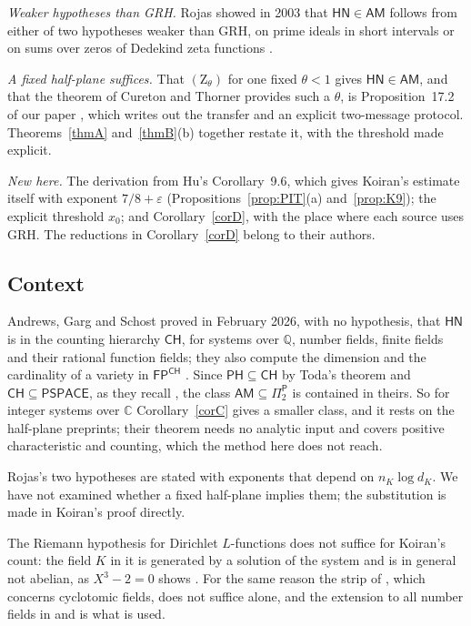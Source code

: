 \documentclass[11pt]{amsart}
\theoremstyle{definition}
\theoremstyle{remark}
\newcommand{\Q}{\mathbb Q}
\newcommand{\C}{\mathbb C}
\newcommand{\cl}[1]{\mathsf{#1}}
\newcommand{\HN}{\cl{HN}}
\newcommand{\AM}{\cl{AM}}
\newcommand{\Pitwo}{\Pi_2^{\cl P}}
\newcommand{\Zh}[1]{(\mathrm Z_{#1})}
\begin{document}
\emph{Weaker hypotheses than GRH.} Rojas showed in 2003 that $\HN\in\AM$ follows from either of two hypotheses weaker than GRH, on prime ideals in short intervals or on sums over zeros of Dedekind zeta functions \cite[Theorem~1]{Roj}.

\emph{A fixed half-plane suffices.} That $\Zh\theta$ for one fixed $\theta<1$ gives $\HN\in\AM$, and that the theorem of Cureton and Thorner provides such a $\theta$, is Proposition~17.2 of our paper \cite[p.~59 and Table~1]{N}, which writes out the transfer and an explicit two-message protocol. Theorems~\ref{thmA} and~\ref{thmB}(b) together restate it, with the threshold made explicit.

\emph{New here.} The derivation from Hu's Corollary~9.6, which gives Koiran's estimate itself with exponent $7/8+\varepsilon$ (Propositions~\ref{prop:PIT}(a) and~\ref{prop:K9}); the explicit threshold $x_0$; and Corollary~\ref{corD}, with the place where each source uses GRH. The reductions in Corollary~\ref{corD} belong to their authors.

\subsection{Context}
Andrews, Garg and Schost proved in February 2026, with no hypothesis, that $\HN$ is in the counting hierarchy $\cl{CH}$, for systems over $\Q$, number fields, finite fields and their rational function fields; they also compute the dimension and the cardinality of a variety in $\cl{FP}^{\cl{CH}}$ \cite[Theorems~1.1, 1.3, 1.4]{AGS}. Since $\cl{PH}\subseteq\cl{CH}$ by Toda's theorem and $\cl{CH}\subseteq\cl{PSPACE}$, as they recall \cite[\S1.2]{AGS}, the class $\AM\subseteq\Pitwo$ is contained in theirs. So for integer systems over $\C$ Corollary~\ref{corC} gives a smaller class, and it rests on the half-plane preprints; their theorem needs no analytic input and covers positive characteristic and counting, which the method here does not reach.

Rojas's two hypotheses \cite[p.~6]{Roj} are stated with exponents that depend on $n_K\log d_K$. We have not examined whether a fixed half-plane implies them; the substitution is made in Koiran's proof directly.

The Riemann hypothesis for Dirichlet $L$-functions does not suffice for Koiran's count: the field $K$ in it is generated by a solution of the system and is in general not abelian, as $X^3-2=0$ shows \cite[\S17]{N}. For the same reason the strip of \cite{OAI}, which concerns cyclotomic fields, does not suffice alone, and the extension to all number fields in \cite{CT} and \cite{Hu} is what is used.
\end{document}
